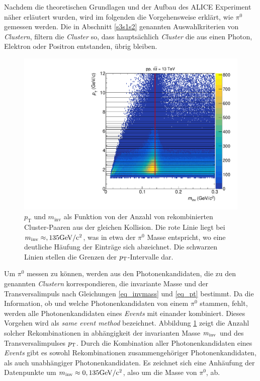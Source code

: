 Nachdem die theoretischen Grundlagen und der Aufbau des ALICE Experiment n\"aher erl\"autert wurden, wird im folgenden die Vorgehensweise erkl\"art, wie $\pi^{0}$ gemessen werden.
\newline
Die in Abschnitt \ref{s3s1s2} genannten Auswahlkriterien von \textit{Clustern}, filtern die \textit{Cluster} so, dass haupts\"achlich \textit{Cluster} die aus einen Photon, Elektron oder Positron entstanden, \"ubrig bleiben.
\newline
\begin{figure}[thp]
\centering
\includegraphics[width=.7\linewidth]{hInvMass_pT_Signal.pdf}
\caption{$p_\text{T}$ und $m_\text{inv}$ als Funktion von der Anzahl von rekombinierten  Cluster-Paaren aus der gleichen Kollision.
Die rote Linie liegt bei $m_{\text{inv}}\approx,135\rm{GeV/}c^{2}$, was in etwa der $\pi^{0}$ Masse entspricht, wo eine deutliche H\"aufung der Eintr\"age sich abzeichnet.
Die schwarzen Linien stellen die Grenzen der $p_{\rm{T}}$-Intervalle dar.}
\label{figInvMassPt_a}
\end{figure}
Um $\pi^{0}$ messen zu k\"onnen, werden aus den Photonenkandidaten, die zu den genannten \textit{Clustern} korrespondieren, die invariante Masse und der Transversalimpuls nach Gleichungen \ref{eq_invmass} und \ref{eq_pt} bestimmt.
Da die Information, ob und welche Photonenkandidaten von einem $\pi^{0}$ stammen, fehlt, werden alle Photonenkandidaten eines \textit{Events} mit einander kombiniert.
Dieses Vorgehen wird als \textit{same event method} bezeichnet.
Abbildung \ref{figInvMassPt_a} zeigt die Anzahl solcher Rekombinationen in abh\"angigkeit der invarianten Masse $m_{\rm{inv}}$ und des Transversalimpulses $p_{\rm{T}}$.
Durch die Kombination aller Photonenkandidaten eines \textit{Events} gibt es sowohl Rekombinationen zusammengeh\"origer Photonenkandidaten, als auch unabh\"angiger Photonenkandidaten.
Es zeichnet sich eine Anh\"aufung der Datenpunkte um $m_{\rm{inv}}\approx 0,135\rm{GeV}/c^{2}$, also um die Masse von $\pi^{0}$, ab.

